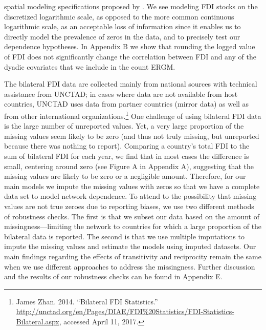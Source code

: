 \documentclass[reqno,onecolumn,letterpaper,12pt]{article}
\begin{document}
spatial modeling specifications proposed by \cite{neumayer2010spatial}.  We see modeling FDI stocks on the discretized logarithmic scale, as opposed to the more common continuous logarithmic scale, as an acceptable loss of information since it enables us to directly model the prevalence of zeros in the data, and to precisely test our dependence hypotheses. In Appendix B we show that rounding the logged value of FDI does not significantly change the correlation between FDI and any of the dyadic covariates that we include in the count ERGM.


The bilateral FDI data are collected mainly from national sources with technical assistance from UNCTAD; in cases where data are not available from host countries, UNCTAD uses data from partner countries (mirror data) as well as from other international organizations.\footnote{James Zhan. 2014. ``Bilateral FDI Statistics.'' \url{http://unctad.org/en/Pages/DIAE/FDI\%20Statistics/FDI-Statistics-Bilateral.aspx}, accessed April 11, 2017.} One challenge of using bilateral FDI data is the large number of unreported values. %
Yet, a very large proportion of the missing values seem likely to be zero (and thus not truly missing, but unreported because there was nothing to report). Comparing a country's total FDI to the sum of bilateral FDI for each year, we find that in most cases the difference is small, centering around zero (see Figure A in Appendix A), suggesting that the missing values are likely to be zero or a negligible amount. Therefore, for our main models we impute the missing values with zeros so that we have a complete data set to model network dependence. To attend to the possibility that missing values are not true zeroes due to reporting biases, we use two different methods of robustness checks. The first is that we subset our data based on the amount of missingness---limiting the network to countries for which a large proportion of the bilateral data is reported. The second is that we use multiple imputations to impute the missing values and estimate the models using imputed datasets. Our main findings regarding the effects of transitivity and reciprocity remain the same when we use different approaches to address the missingness. Further discussion and the results of our robustness checks can be found in Appendix E.
\end{document}
